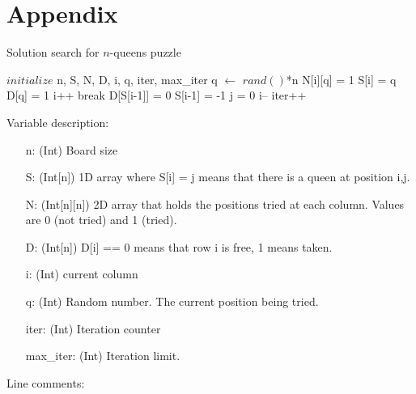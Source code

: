 \documentclass{article}
\begin{document}
\section{Appendix}
\begin{algorithm}[H]
\caption{Solution search for $n$-queens puzzle}
\label{alg:solvePuzzle}
\begin{algorithmic}[1]
    \State $initialize$ n, S, N, D, i, q, iter, max\_iter
        \State q $\gets$ $rand()$*n
            \State N[i][q] = 1 
                \State S[i] = q
                \State D[q] = 1
                \State i++
                    \State break
                \EndIf
            \EndIf
        \EndIf 
        \State D[S[i-1]] = 0
        \State S[i-1] = -1
            \State j = 0
        \EndFor     
        \State i--
    \EndIf
    \State iter++
    \EndWhile  
\end{algorithmic}
\end{algorithm}
Variable description:
\begin{enumerate}
    \item [n:] (Int) Board size
    \item [S:] (Int[n]) 1D array where S[i] = j means that there is a queen at position i,j. 
    \item [N:] (Int[n][n]) 2D array that holds the positions tried at each column. Values are 0 (not tried) and 1 (tried).
    \item [D:] (Int[n]) D[i] == 0 means that row i is free, 1 means taken.
    \item [i:] (Int) current column 
    \item [q:] (Int) Random number. The current position being tried.
    \item [iter:] (Int) Iteration counter
    \item [max\_iter:] (Int) Iteration limit.
\end{enumerate}
Line comments:
\end{document}
